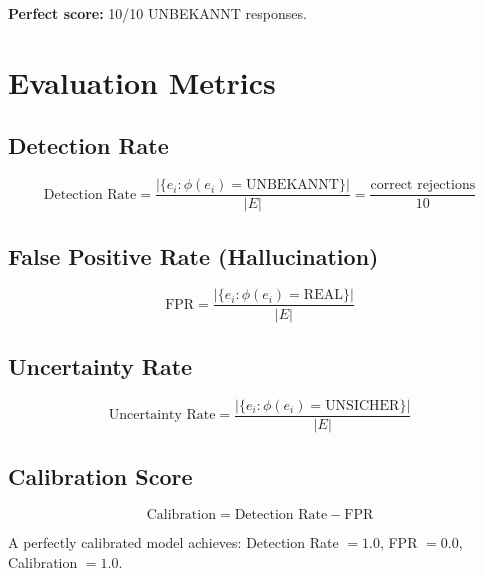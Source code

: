 \documentclass[11pt,a4paper]{article}
\begin{document}
\textbf{Perfect score:} 10/10 UNBEKANNT responses.



\section{Evaluation Metrics}

\subsection{Detection Rate}

\begin{equation}
\text{Detection Rate} = \frac{|\{e_i : \phi(e_i) = \text{UNBEKANNT}\}|}{|E|} = \frac{\text{correct rejections}}{10}
\end{equation}

\subsection{False Positive Rate (Hallucination)}

\begin{equation}
\text{FPR} = \frac{|\{e_i : \phi(e_i) = \text{REAL}\}|}{|E|}
\end{equation}

\subsection{Uncertainty Rate}

\begin{equation}
\text{Uncertainty Rate} = \frac{|\{e_i : \phi(e_i) = \text{UNSICHER}\}|}{|E|}
\end{equation}

\subsection{Calibration Score}

\begin{equation}
\text{Calibration} = \text{Detection Rate} - \text{FPR}
\end{equation}

A perfectly calibrated model achieves: Detection Rate $= 1.0$, FPR $= 0.0$, Calibration $= 1.0$.


\end{document}
